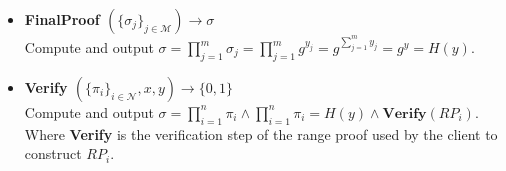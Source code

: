 \begin{algorithm}
\begin{itemize}
\item\textbf{FinalProof $(\{\sigma_j\}_{j\in\mathcal{M}})\xrightarrow[]{}\sigma$}\\
Compute and output $\sigma = \prod_{j=1}^m \sigma_j = \prod_{j=1}^m g^{y_{j}} =  g^{\sum_{j=1}^m y_{j}}= g^{y}=H(y)$.

\item\textbf{Verify $(\{\pi_i\}_{i\in\mathcal{N}},x,y)\xrightarrow[]{}\{0,1\}$}\\
Compute and output $\sigma= \prod_{i=1}^n \pi_i \wedge \prod_{i=1}^n \pi_i = H(y)\wedge \textbf{Verify}(RP_i)$. Where \textbf{Verify} is the verification step of the range proof used by the client to construct $RP_i$.
\end{itemize}
\label{alg:VAHSS-HSS-RP}
\end{algorithm}

